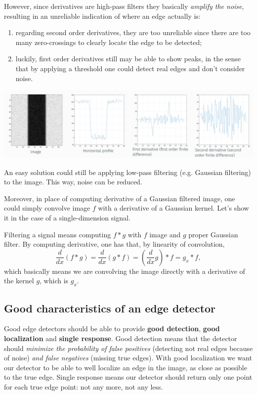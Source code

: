 \documentclass[10pt]{report}
\begin{document}
However, since derivatives are high-pass filters they basically \emph{amplify
the noise}, resulting in an unreliable indication of where an edge
actually is:

\begin{enumerate}
\item regarding second order derivatives, they are too unreliable since
there are too many zero-crossings to clearly locate the edge to be
detected;
\item luckily, first order derivatives still may be able to show peaks, in
the sense that by applying a threshold one could detect real edges
and don't consider noise.
\end{enumerate}

\begin{center}
\includegraphics[width=.9\linewidth]{./pics/det/edges-derivatives-with-noise.jpg}
\end{center}

An easy solution could still be applying low-pass filtering
(e.g. Gaussian filtering) to the image. This way, noise can be reduced.

Moreover, in place of computing derivative of a Gaussian filtered image,
one could simply convolve image \(f\) with a derivative of a Gaussian
kernel. Let's show it in the case of a single-dimension signal.

Filtering a signal means computing \(f * g\) with \(f\) image and \(g\)
proper Gaussian filter. By computing derivative, one has that, by
linearity of convolution,
\[\frac{d}{dx}\left(f * g\right) = \frac{d}{dx}\left(g * f\right) = \left(\frac{d}{dx}g\right) * f = g_ x * f,\]
which basically means we are convolving the image directly with a
derivative of the kernel \(g\), which is \(g_ x\).

\subsection{Good characteristics of an edge detector}
\label{good-characteristics-of-an-edge-detector}
Good edge detectors should be able to provide \textbf{good detection}, \textbf{good
localization} and \textbf{single response}. Good detection means that the
detector should \emph{minimize the probability of false positives} (detecting
not real edges because of noise) \emph{and false negatives} (missing true
edges). With good localization we want our detector to be able to well
localize an edge in the image, as close as possible to the true edge.
Single response means our detector should return only one point for each
true edge point: not any more, not any less.
\end{document}
